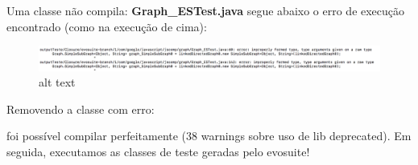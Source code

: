 \documentclass[11pt]{article}
\makeatletter
\def\maxwidth{\ifdim\Gin@nat@width>\linewidth\linewidth
    \else\Gin@nat@width\fi}
\let\Oldincludegraphics\includegraphics
\renewcommand{\includegraphics}[1]{\Oldincludegraphics[width=.8\maxwidth]{#1}}
\newenvironment{Shaded}{}{}
\newcommand{\StringTok}[1]{\textcolor[rgb]{0.25,0.44,0.63}{{#1}}}
\newcommand{\FunctionTok}[1]{\textcolor[rgb]{0.02,0.16,0.49}{{#1}}}
\newcommand{\NormalTok}[1]{{#1}}
\newcommand{\VariableTok}[1]{\textcolor[rgb]{0.10,0.09,0.49}{{#1}}}
\newcommand{\ExtensionTok}[1]{{#1}}
\makeatother
\begin{document}
    Uma classe não compila: \textbf{Graph\_ESTest.java} segue abaixo o erro
de execução encontrado (como na execução de cima):

    \begin{figure}
\centering
\includegraphics{pic/erroCompFixed.png}
\caption{alt text}
\end{figure}

    Removendo a classe com erro:

    \begin{Shaded}
\end{Shaded}

    foi possível compilar perfeitamente (\(38\) warnings sobre uso de lib
deprecated). Em seguida, executamos as classes de teste geradas pelo
evosuite!
\end{document}
